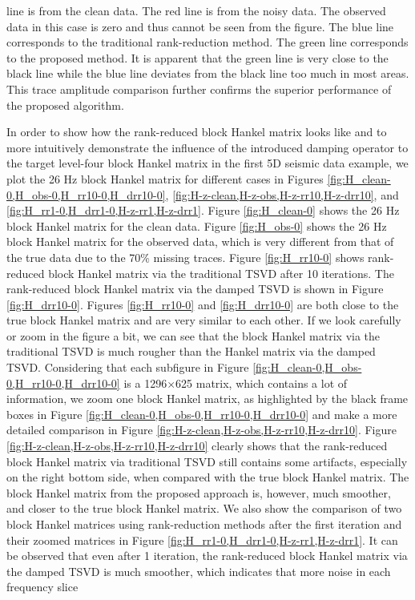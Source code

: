 line is from the clean data. The red line is from the noisy data. The observed data in this case is zero and thus cannot be seen from the figure. The blue line corresponds to the traditional rank-reduction method. The green line corresponds to the proposed method. It is apparent that the green line is very close to the black line while the blue line deviates from the black line too much in most areas. This trace amplitude comparison  further confirms the superior performance of the proposed algorithm. 

In order to show how the rank-reduced block Hankel matrix looks like and to more intuitively demonstrate the influence of the introduced damping operator to the target level-four block Hankel matrix in the first 5D seismic data example, we plot the 26 Hz block Hankel matrix for different  cases in Figures \ref{fig:H_clean-0,H_obs-0,H_rr10-0,H_drr10-0}, \ref{fig:H-z-clean,H-z-obs,H-z-rr10,H-z-drr10}, and \ref{fig:H_rr1-0,H_drr1-0,H-z-rr1,H-z-drr1}. Figure \ref{fig:H_clean-0} shows the 26 Hz block Hankel matrix for the clean data.  Figure \ref{fig:H_obs-0} shows the 26 Hz block Hankel matrix for the observed data, which is very different from that of the true data due to the 70\% missing traces. Figure \ref{fig:H_rr10-0} shows rank-reduced block Hankel matrix via the traditional TSVD after 10 iterations.  The rank-reduced block Hankel matrix via the damped TSVD is shown in Figure \ref{fig:H_drr10-0}. Figures \ref{fig:H_rr10-0} and \ref{fig:H_drr10-0} are both close to the true block Hankel matrix and are very similar to each other. If we look carefully or zoom in the figure a bit, we can see that the block Hankel matrix via the traditional TSVD is much rougher than the Hankel matrix via the damped TSVD. Considering that each subfigure in Figure \ref{fig:H_clean-0,H_obs-0,H_rr10-0,H_drr10-0} is a 1296$\times$625 matrix, which contains a lot of information, we zoom one block Hankel matrix, as highlighted by the black frame boxes in Figure \ref{fig:H_clean-0,H_obs-0,H_rr10-0,H_drr10-0} and make a more detailed comparison in Figure \ref{fig:H-z-clean,H-z-obs,H-z-rr10,H-z-drr10}. Figure \ref{fig:H-z-clean,H-z-obs,H-z-rr10,H-z-drr10} clearly shows that the rank-reduced block Hankel matrix via traditional TSVD still contains some artifacts, especially on the right bottom side, when compared with the true block Hankel matrix. The block Hankel matrix from the proposed approach is, however, much smoother, and closer to the true block Hankel matrix. We also show the comparison of two block Hankel matrices using rank-reduction methods after the first iteration and their zoomed matrices in Figure \ref{fig:H_rr1-0,H_drr1-0,H-z-rr1,H-z-drr1}. It can be observed that even after 1 iteration, the rank-reduced block Hankel matrix via the damped TSVD is much smoother, which indicates that more noise in each frequency slice
